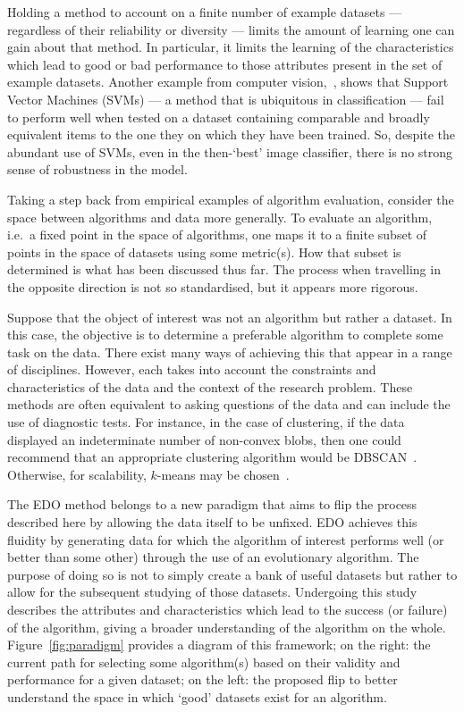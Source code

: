 Holding a method to account on a finite number of example datasets ---
regardless of their reliability or diversity --- limits the amount of learning
one can gain about that method. In particular, it limits the learning of the
characteristics which lead to good or bad performance to those attributes
present in the set of example datasets. Another example from computer
vision,~\cite{Torralba2011}, shows that Support Vector Machines (SVMs) --- a
method that is ubiquitous in classification --- fail to perform well when tested
on a dataset containing comparable and broadly equivalent items to the one they
on which they have been trained. So, despite the abundant use of SVMs, even in
the then-`best' image classifier, there is no strong sense of robustness in the
model.

Taking a step back from empirical examples of algorithm evaluation, consider the
space between algorithms and data more generally. To evaluate an algorithm,
i.e.\ a fixed point in the space of algorithms, one maps it to a finite subset
of points in the space of datasets using some metric(s). How that subset is
determined is what has been discussed thus far. The process when travelling in
the opposite direction is not so standardised, but it appears more rigorous.

Suppose that the object of interest was not an algorithm but rather a dataset.
In this case, the objective is to determine a preferable algorithm to complete
some task on the data. There exist many ways of achieving this that appear in a
range of disciplines. However, each takes into account the constraints and
characteristics of the data and the context of the research problem. These
methods are often equivalent to asking questions of the data and can include the
use of diagnostic tests. For instance, in the case of clustering, if the data
displayed an indeterminate number of non-convex blobs, then one could recommend
that an appropriate clustering algorithm would be DBSCAN~\cite{Ester1996}.
Otherwise, for scalability, \(k\)-means may be chosen~\cite{Wu2009,Zhao2009}.

The EDO method belongs to a new paradigm that aims to flip the process described
here by allowing the data itself to be unfixed. EDO achieves this fluidity by
generating data for which the algorithm of interest performs well (or better
than some other) through the use of an evolutionary algorithm. The purpose of
doing so is not to simply create a bank of useful datasets but rather to allow
for the subsequent studying of those datasets. Undergoing this study describes
the attributes and characteristics which lead to the success (or failure) of the
algorithm, giving a broader understanding of the algorithm on the whole.
Figure~\ref{fig:paradigm} provides a diagram of this framework; on the right:
the current path for selecting some algorithm(s) based on their validity and
performance for a given dataset; on the left: the proposed flip to better
understand the space in which `good' datasets exist for an algorithm.

